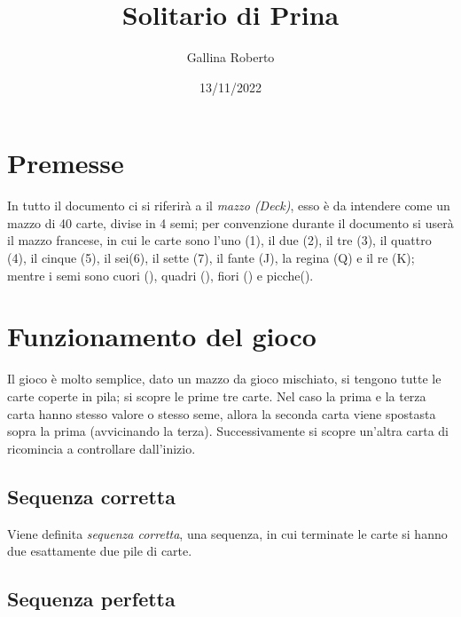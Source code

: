 \documentclass[a4paper]{article}
\begin{document}
\begin{titlepage}
    \title{Solitario di Prina}
    \author{Gallina Roberto}
    \date{13/11/2022}
    \maketitle
\end{titlepage}

\newpage

\tableofcontents

\newpage

\section{Premesse}
In tutto il documento ci si riferirà a il \emph{mazzo (Deck)}, esso è da intendere come un mazzo di 40 carte, divise in 4 semi; per convenzione durante il documento si userà il mazzo francese, in cui le carte sono l'uno (1), il due (2), il tre (3), il quattro (4), il cinque (5), il sei(6), il sette (7), il fante (J), la regina (Q) e il re (K); mentre i semi sono cuori (), quadri (), fiori () e picche().



\newpage

\section{Funzionamento del gioco}

Il gioco è molto semplice, dato un mazzo da gioco mischiato, si tengono tutte le carte coperte in pila; si scopre le prime tre carte.
Nel caso la prima e la terza carta hanno stesso valore o stesso seme, allora la seconda carta viene spostasta sopra la prima (avvicinando la terza).
Successivamente si scopre un'altra carta di ricomincia a controllare dall'inizio.


\subsection{Sequenza corretta}

Viene definita \emph{sequenza corretta}, una sequenza, in cui terminate le carte si hanno due esattamente due pile di carte.




\subsection{Sequenza perfetta}
\end{document}
